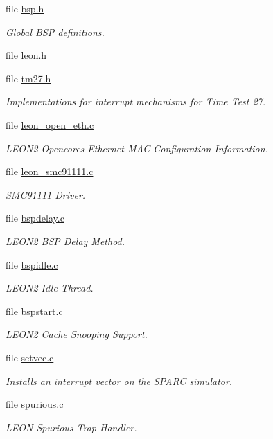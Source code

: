 \begin{DoxyCompactItemize}
file \mbox{\hyperlink{bsps_2sparc_2leon2_2include_2bsp_8h}{bsp.\+h}}
\begin{DoxyCompactList}\small\item\em Global B\+SP definitions. \end{DoxyCompactList}\item 
file \mbox{\hyperlink{leon2_2include_2leon_8h}{leon.\+h}}
\item 
file \mbox{\hyperlink{sparc_2leon2_2include_2tm27_8h}{tm27.\+h}}
\begin{DoxyCompactList}\small\item\em Implementations for interrupt mechanisms for Time Test 27. \end{DoxyCompactList}\item 
file \mbox{\hyperlink{leon2_2net_2leon__open__eth_8c}{leon\+\_\+open\+\_\+eth.\+c}}
\begin{DoxyCompactList}\small\item\em L\+E\+O\+N2 Opencores Ethernet M\+AC Configuration Information. \end{DoxyCompactList}\item 
file \mbox{\hyperlink{leon2_2net_2leon__smc91111_8c}{leon\+\_\+smc91111.\+c}}
\begin{DoxyCompactList}\small\item\em S\+M\+C91111 Driver. \end{DoxyCompactList}\item 
file \mbox{\hyperlink{leon2_2start_2bspdelay_8c}{bspdelay.\+c}}
\begin{DoxyCompactList}\small\item\em L\+E\+O\+N2 B\+SP Delay Method. \end{DoxyCompactList}\item 
file \mbox{\hyperlink{sparc_2leon2_2start_2bspidle_8c}{bspidle.\+c}}
\begin{DoxyCompactList}\small\item\em L\+E\+O\+N2 Idle Thread. \end{DoxyCompactList}\item 
file \mbox{\hyperlink{sparc_2leon2_2start_2bspstart_8c}{bspstart.\+c}}
\begin{DoxyCompactList}\small\item\em L\+E\+O\+N2 Cache Snooping Support. \end{DoxyCompactList}\item 
file \mbox{\hyperlink{sparc_2leon2_2start_2setvec_8c}{setvec.\+c}}
\begin{DoxyCompactList}\small\item\em Installs an interrupt vector on the S\+P\+A\+RC simulator. \end{DoxyCompactList}\item 
file \mbox{\hyperlink{leon2_2start_2spurious_8c}{spurious.\+c}}
\begin{DoxyCompactList}\small\item\em L\+E\+ON Spurious Trap Handler. \end{DoxyCompactList}\end{DoxyCompactItemize}
